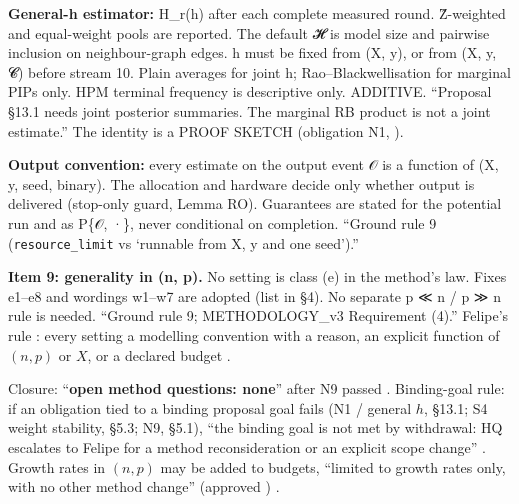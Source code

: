 \par\smallskip\noindent{}
{\textbf{General-h estimator:} H\_r(h) after each complete measured round. Ẑ-weighted and equal-weight pools are reported. The default
𝓗 is model size and pairwise inclusion on neighbour-graph edges. h must be fixed from (X, y), or from (X, y, 𝓒) before stream 10.
Plain averages for joint h; Rao–Blackwellisation for marginal PIPs only. HPM terminal frequency is descriptive only. ADDITIVE.
}
{``Proposal §13.1 needs joint posterior summaries. The marginal RB product is not a joint estimate.'' The identity is a PROOF
SKETCH (obligation N1, ).}

\par\smallskip\noindent{}
{\textbf{Output convention:} every estimate on the output event 𝒪 is a function of (X, y, seed, binary). The allocation and hardware
decide only whether output is delivered (stop-only guard, Lemma RO). Guarantees are stated for the potential run and as P\{𝒪, ·\},
never conditional on completion. }
{``Ground rule 9 (\texttt{resource\_limit} vs `runnable from X, y and one seed').''}

\par\smallskip\noindent{}
{\textbf{Item 9: generality in (n, p).} No setting is class (e) in the method's law. Fixes e1–e8 and wordings w1–w7 are adopted (list
in §4). No separate p ≪ n / p ≫ n rule is needed. }
{``Ground rule 9; METHODOLOGY\_v3 Requirement (4).'' Felipe's rule : every setting a modelling convention with a reason, an
explicit function of $(n,p)$ or $X$, or a declared budget .}

\smallskip
Closure: ``\textbf{open method questions: none}'' after N9 passed . Binding-goal
rule: if an obligation tied to a binding proposal goal fails (N1 / general $h$, \S13.1; S4 weight stability, \S5.3; N9, \S5.1),
``the binding goal is not met by withdrawal: HQ escalates to Felipe for a method reconsideration or an explicit scope change''
. Growth rates in $(n,p)$ may be added to budgets, ``limited to growth rates only,
with no other method change'' (approved ) .

